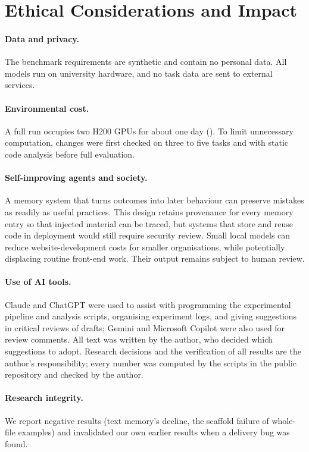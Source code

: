 \section{Ethical Considerations and Impact}
\paragraph{Data and privacy.} The benchmark requirements are synthetic and contain no personal data. All models run on university hardware, and no task data are sent to external services.
\paragraph{Environmental cost.} A full run occupies two H200 GPUs for about one day (). To limit unnecessary computation, changes were first checked on three to five tasks and with static code analysis before full evaluation.
\paragraph{Self-improving agents and society.} A memory system that turns outcomes into later behaviour can preserve mistakes as readily as useful practices. This design retains provenance for every memory entry so that injected material can be traced, but systems that store and reuse code in deployment would still require security review. Small local models can reduce website-development costs for smaller organisations, while potentially displacing routine front-end work. Their output remains subject to human review.
\paragraph{Use of AI tools.} Claude and ChatGPT were used to assist with programming the experimental pipeline and analysis scripts, organising experiment logs, and giving suggestions in critical reviews of drafts; Gemini and Microsoft Copilot were also used for review comments. All text was written by the author, who decided which suggestions to adopt. Research decisions and the verification of all results are the author's responsibility; every number was computed by the scripts in the public repository and checked by the author. 

\paragraph{Research integrity.} We report negative results (text memory's decline, the scaffold failure of whole-file examples) and invalidated our own earlier results when a delivery bug was found.

